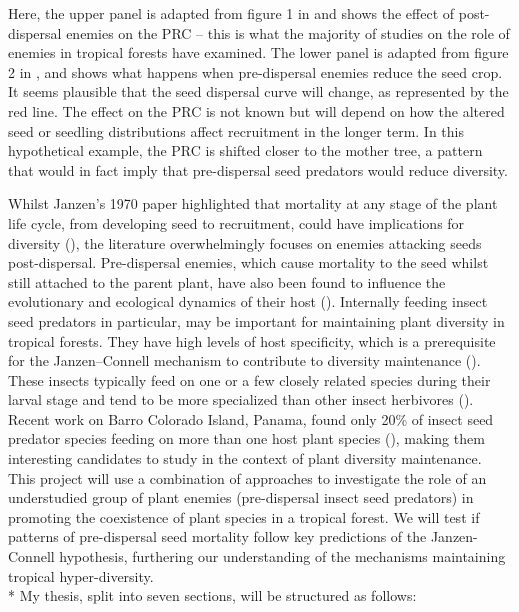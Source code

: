 \documentclass[12pt,a4]{RDGThesis}
\begin{document}
\begin{framed}
{Here, the upper panel is adapted from figure 1 in \cite{janzenHerbivoresNumberTree1970} and shows the effect of post-dispersal enemies on the PRC – this is what the majority of studies on the role of enemies in tropical forests have examined. The lower panel is adapted from figure 2 in \cite{janzenHerbivoresNumberTree1970}, and shows what happens when pre-dispersal enemies reduce the seed crop. It seems plausible that the seed dispersal curve will change, as represented by the red line. The effect on the PRC is not known but will depend on how the altered seed or seedling distributions affect recruitment in the longer term. In this hypothetical example, the PRC is shifted closer to the mother tree, a pattern that would in fact imply that pre-dispersal seed predators would reduce diversity.}
\end{framed}


Whilst Janzen’s 1970 paper highlighted that mortality at any stage of the plant life cycle, from developing seed to recruitment, could have implications for diversity (\cite{janzenHerbivoresNumberTree1970}), the literature overwhelmingly focuses on enemies attacking seeds post-dispersal. Pre-dispersal enemies, which cause mortality to the seed whilst still attached to the parent plant, have also been found to influence the evolutionary and ecological dynamics of their host (\cite{kolbEcologicalEvolutionaryConsequences2007}). Internally feeding insect seed predators in particular, may be important for maintaining plant diversity in tropical forests. They have high levels of host specificity, which is a prerequisite for the Janzen–Connell mechanism to contribute to diversity maintenance (\cite{sedioHowSpecialisedMust2013, stumpDistanceresponsivePredationNot2015}). These insects typically feed on one or a few closely related species during their larval stage and tend to be more specialized than other insect herbivores (\cite{novotnyHostSpecificityInsect2005}). Recent work on Barro Colorado Island, Panama, found only 20\% of insect seed predator species feeding on more than one host plant species (\cite{gripenbergHighlyResolvedFood2019}), making them interesting candidates to study in the context of plant diversity maintenance. \\

This project will use a combination of approaches to investigate the role of an understudied group of plant enemies (pre-dispersal insect seed predators) in promoting the coexistence of plant species in a tropical forest. We will test if patterns of pre-dispersal seed mortality follow key predictions of the Janzen-Connell hypothesis, furthering our understanding of the mechanisms maintaining tropical hyper-diversity. \\* My thesis, split into seven sections, will be structured as follows: \\
\end{document}
